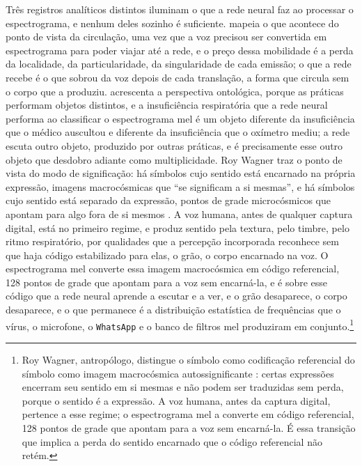 Três registros analíticos distintos iluminam o que a rede neural faz ao processar o espectrograma, e nenhum deles sozinho é suficiente. \textcite{Latour2017Esperanca} mapeia o que acontece do ponto de vista da circulação, uma vez que a voz precisou ser convertida em espectrograma para poder viajar até a rede, e o preço dessa mobilidade é a perda da localidade, da particularidade, da singularidade de cada emissão; o que a rede recebe é o que sobrou da voz depois de cada translação, a forma que circula sem o corpo que a produziu. \textcite{mol2002body} acrescenta a perspectiva ontológica, porque as práticas performam objetos distintos, e a insuficiência respiratória que a rede neural performa ao classificar o espectrograma mel é um objeto diferente da insuficiência que o médico auscultou e diferente da insuficiência que o oxímetro mediu; a rede escuta outro objeto, produzido por outras práticas, e é precisamente esse outro objeto que desdobro adiante como multiplicidade. Roy Wagner traz o ponto de vista do modo de significação: há símbolos cujo sentido está encarnado na própria expressão, imagens macrocósmicas que \enquote{se significam a si mesmas}, e há símbolos cujo sentido está separado da expressão, pontos de grade microcósmicos que apontam para algo fora de si mesmos \parencite{Wagner2018Simbolos}. A voz humana, antes de qualquer captura digital, está no primeiro regime, e produz sentido pela textura, pelo timbre, pelo ritmo respiratório, por qualidades que a percepção incorporada reconhece sem que haja código estabilizado para elas, o grão, o corpo encarnado na voz. O espectrograma mel converte essa imagem macrocósmica em código referencial, 128 pontos de grade que apontam para a voz sem encarná-la, e é sobre esse código que a rede neural aprende a escutar e a ver, e o grão desaparece, o corpo desaparece, e o que permanece é a distribuição estatística de frequências que o vírus, o microfone, o \texttt{WhatsApp} e o banco de filtros mel produziram em conjunto.\footnote{Roy Wagner, antropólogo, distingue o símbolo como codificação referencial do símbolo como imagem macrocósmica autossignificante \parencite{Wagner2018Simbolos}: certas expressões encerram seu sentido em si mesmas e não podem ser traduzidas sem perda, porque o sentido é a expressão. A voz humana, antes da captura digital, pertence a esse regime; o espectrograma mel a converte em código referencial, 128 pontos de grade que apontam para a voz sem encarná-la. É essa transição que implica a perda do sentido encarnado que o código referencial não retém.}

